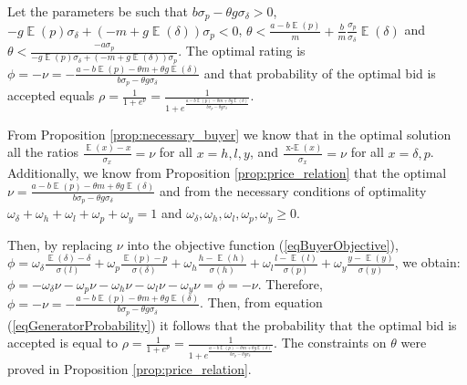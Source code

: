 \documentclass[informs]{informs3}
\begin{document}
\begin{proposition}\label{prop:optimal_bid}
Let the parameters be such that $b\sigma_{p}-\theta g\sigma_{\delta} > 0$, $- g \mathop{\mathbb{E}}\left(p\right)\sigma_{\delta}+\left(-m+g \mathop{\mathbb{E}}\left(\delta\right)\right)\sigma_{p}<0$, 
$ \theta < \frac{a-b\mathop{\mathbb{E}}\left(p\right)}{m}   +\frac{b}{m} \frac{\sigma_{p}}{\sigma_{\delta}} \mathop{\mathbb{E}}\left(\delta\right)$ and
$\theta<\frac{-a\sigma_{p}}{- g \mathop{\mathbb{E}}\left(p\right)\sigma_{\delta}+\left(-m+g \mathop{\mathbb{E}}\left(\delta\right)\right)\sigma_{p}}$.   
 The optimal rating is $\phi=-\nu =-\frac{a-b \mathop{\mathbb{E}}\left(p\right)-\theta m+\theta g \mathop{\mathbb{E}}\left(\delta\right)}{b\sigma_{p}-\theta g\sigma_{\delta}}$ and that probability of the optimal bid is accepted equals $\rho=\frac{1}{1+e^{\nu}}=\frac{1}{1+e^{\frac{a-b \mathop{\mathbb{E}}\left(p\right)-\theta m+\theta g \mathop{\mathbb{E}}\left(\delta\right)}{b\sigma_{p}-\theta g\sigma_{\delta}}  }}$.

\end{proposition}
%
From Proposition \ref{prop:necessary_buyer} we know that in the optimal solution all the ratios $\frac{\mathop{\mathbb{E}}\left(x\right)-x}{\sigma_{x}} = \nu$ for all $x = {h, l, y}$, and $\frac{\mathop{x-\mathbb{E}}\left(x\right)}{\sigma_{x}} = \nu$ for all $x = {\delta, p}$. Additionally, we know from Proposition \ref{prop:price_relation} that the optimal $\nu =\frac{a-b \mathop{\mathbb{E}}\left(p\right)-\theta m+\theta g \mathop{\mathbb{E}}\left(\delta\right)}{b\sigma_{p}-\theta g\sigma_{\delta}}$ and from the necessary conditions of optimality 
$\omega_{\delta}+\omega_{h}+\omega_{l}+\omega_{p}+\omega_{y}=1 $ and 		
$\omega_{\delta},\omega_{h},\omega_{l},\omega_{p},\omega_{y} \geq 0$. 

Then, by replacing $\nu$ into the objective function (\ref{eqBuyerObjective}), 
$\phi=\omega_{\delta}\frac{\mathop{\mathbb{E}}\left(\delta\right)-\delta }
{\sigma\left(l\right)}+\omega_{p}\frac{\mathop{\mathbb{E}}\left(p\right)-p}  {\sigma\left(\delta\right)} 
+\omega_{h}\frac{ h-\mathop{\mathbb{E}}\left(h\right)}
{\sigma\left(h\right)}+\omega_{l}\frac{ l-\mathop{\mathbb{E}}\left(l\right) }{\sigma\left(p\right)}+\omega_{y}\frac{y-\mathop{\mathbb{E}}\left(y\right)}{\sigma\left(y\right)}$, we obtain:
$\phi=-\omega_{\delta}\nu-\omega_{p}\nu 
-\omega_{h}\nu-\omega_{l}\nu-\omega_{y}\nu = \phi=-\nu$. Therefore, 
$\phi=-\nu =-\frac{a-b \mathop{\mathbb{E}}\left(p\right)-\theta m+\theta g \mathop{\mathbb{E}}\left(\delta\right)}{b\sigma_{p}-\theta g\sigma_{\delta}}$.  Then, from equation (\ref{eqGeneratorProbability}) it follows that the probability that the optimal bid is accepted is equal to  
$\rho=\frac{1}{1+e^{\nu}}=\frac{1}{1+e^{\frac{a-b \mathop{\mathbb{E}}\left(p\right)-\theta m+\theta g \mathop{\mathbb{E}}\left(\delta\right)}{b\sigma_{p}-\theta g\sigma_{\delta}}  }}$.
The constraints on $\theta$ were proved in Proposition \ref{prop:price_relation}.\Halmos
\endproof
\end{document}
